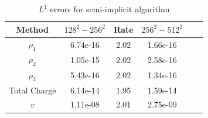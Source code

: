 \documentclass[final]{siamltex}
\begin{document}
\begin{table}
\begin{center}
\caption{$L^1$ errors for semi-implicit algorithm}
\label{tab:semi-implicit convergence}
\begin{tabular}{cccccc}
\\ \hline\hline                                                                 
Method & $128^2-256^2$ & Rate & $256^2-512^2$ \\
\hline\hline
$\rho_1$     & 6.74e-16 & 2.02 & 1.66e-16 \\
$\rho_2$     & 1.05e-15 & 2.02 & 2.58e-16 \\
$\rho_3$     & 5.43e-16 & 2.02 & 1.34e-16 \\
Total Charge & 6.14e-14 & 1.95 & 1.59e-14 \\
$v$          & 1.11e-08 & 2.01 & 2.75e-09 \\
\end{tabular}
\end{center}
\end{table}



\end{document}
